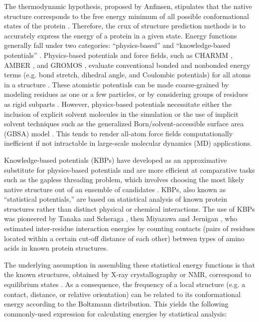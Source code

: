\documentclass[11pt,titlepage]{article}
\begin{document}
The thermodynamic hypothesis, proposed by Anfinsen, stipulates that the native structure corresponds to the free energy minimum of all possible conformational states of the protein \cite{anfinsen}.
Therefore, the crux of structure prediction methods is to accurately express the energy of a protein in a given state. 
Energy functions generally fall under two categories: ``physics-based'' and ``knowledge-based potentials'' \cite{lu}.
Physics-based potentials and force fields, such as CHARMM \cite{brooks}, AMBER \cite{amber}, and GROMOS \cite{gromos}, evaluate conventional bonded and nonbonded energy terms (e.g. bond stretch, dihedral angle, and Coulombic potentials) for all atoms in a structure \cite{brooks2}.
These atomistic potentials can be made coarse-grained by modeling residues as one or a few particles, or by considering groups of residues as rigid subparts \cite{basdevant,potestio,enciso,monticelli}.
However, physics-based potentials necessitate either the inclusion of explicit solvent molecules in the simulation \cite{onufriev} or the use of implicit solvent techniques such as the generalized Born/solvent-accessible surface area (GBSA) model \cite{feig,roux}.
This tends to render all-atom force fields computationally inefficient if not intractable in large-scale molecular dynamics (MD) applications.

Knowledge-based potentials (KBPs) have developed as an approximative substitute for physics-based potentials and are more efficient at comparative tasks such as the gapless threading problem, which involves choosing the most likely native structure out of an ensemble of candidates \cite{thomas2}.
KBPs, also known as ``statistical potentials,'' are based on statistical analysis of known protein structures rather than distinct physical or chemical interactions. 
The use of KBPs was pioneered by Tanaka and Scheraga \cite{tanaka}, then Miyazawa and Jernigan \cite{miyazawa}, who estimated inter-residue interaction energies by counting contacts (pairs of residues located within a certain cut-off distance of each other) between types of amino acids in known protein structures.

The underlying assumption in assembling these statistical energy functions is that the known structures, obtained by X-ray crystallography or NMR, correspond to equilibrium states \cite{buchete2003}. 
As a consequence, the frequency of a local structure (e.g. a contact, distance, or relative orientation) can be related to its conformational energy according to the Boltzmann distribution.
This yields the following commonly-used expression for calculating energies by statistical analysis:
\end{document}
